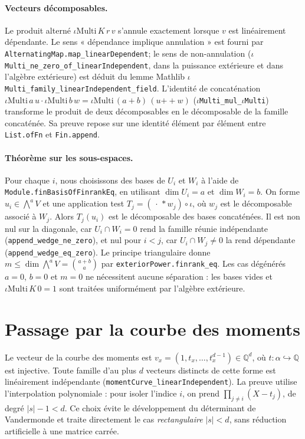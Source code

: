 \documentclass[11pt]{article}
\newcommand{\QQ}{\mathbb{Q}}
\newcommand{\bind}[2]{\binom{#1}{#2}}
\newcommand{\wedgep}[1]{\textstyle\bigwedge^{#1}}
\begin{document}
\paragraph{Vecteurs décomposables.} Le produit alterné
$\iota\mathrm{Multi}\,K\,r\,v$ s'annule exactement lorsque $v$ est linéairement
dépendante. Le sens « dépendance implique annulation » est fourni par
\lstinline{AlternatingMap.map_linearDependent}; le sens de non-annulation
(\texttt{\(\iota\)Multi\_ne\_zero\_of\_linearIndependent}, dans la puissance extérieure
et dans l'algèbre extérieure) est déduit du lemme Mathlib
\texttt{\(\iota\)Multi\_family\_linearIndependent\_field}. L'identité de concaténation
$\iota\mathrm{Multi}\,a\,u\cdot\iota\mathrm{Multi}\,b\,w=
\iota\mathrm{Multi}\,(a+b)\,(u\mathbin{+\!\!+}w)$
(\texttt{\(\iota\)Multi\_mul\_\(\iota\)Multi}) transforme le produit de deux
décomposables en le décomposable de la famille concaténée. Sa preuve repose sur une
identité élément par élément entre \lstinline{List.ofFn} et \lstinline{Fin.append}.

\paragraph{Théorème sur les sous-espaces.} Pour chaque $i$, nous choisissons des bases de
$U_i$ et $W_i$ à l'aide de \lstinline{Module.finBasisOfFinrankEq}, en utilisant
$\dim U_i=a$ et $\dim W_i=b$. On forme $u_i\in\wedgep{a}V$ et une application test
$T_j=(\,\cdot\,*w_j)\circ\iota$, où $w_j$ est le décomposable associé à $W_j$.
Alors $T_j(u_i)$ est le décomposable des bases concaténées. Il est non nul sur la
diagonale, car $U_i\cap W_i=0$ rend la famille réunie indépendante
(\lstinline{append_wedge_ne_zero}), et nul pour $i<j$, car
$U_i\cap W_j\neq0$ la rend dépendante (\lstinline{append_wedge_eq_zero}). Le principe
triangulaire donne
$m\le\dim\wedgep{a}V=\bind{a+b}{a}$ par
\lstinline{exteriorPower.finrank_eq}. Les cas dégénérés $a=0$, $b=0$ et $m=0$ ne
nécessitent aucune séparation : les bases vides et
$\iota\mathrm{Multi}\,K\,0=1$ sont traitées uniformément par l'algèbre extérieure.

\section{Passage par la courbe des moments}\label{sec:bridge}

Le vecteur de la courbe des moments est
$v_x=(1,t_x,\dots,t_x^{d-1})\in\QQ^d$, où
$t:\alpha\hookrightarrow\QQ$ est injective. Toute famille d'au plus $d$ vecteurs
distincts de cette forme est linéairement indépendante
(\lstinline{momentCurve_linearIndependent}). La preuve utilise l'interpolation
polynomiale : pour isoler l'indice $i$, on prend
$\prod_{j\neq i}(X-t_j)$, de degré $|s|-1<d$. Ce choix évite le développement du
déterminant de Vandermonde et traite directement le cas \emph{rectangulaire} $|s|<d$,
sans réduction artificielle à une matrice carrée.
\end{document}
